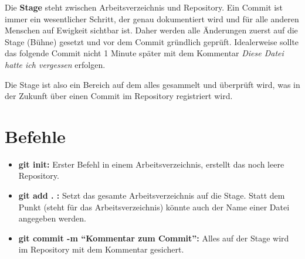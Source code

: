\documentclass[11pt]{article}
\begin{document}
Die \textbf{Stage} steht zwischen Arbeitsverzeichnis und Repository.
Ein Commit ist immer ein wesentlicher Schritt, der genau dokumentiert
wird und für alle anderen Menschen auf Ewigkeit sichtbar ist. Daher
werden alle Änderungen zuerst auf die Stage (Bühne) gesetzt und vor
dem Commit gründlich geprüft. Idealerweise sollte das folgende Commit
nicht 1 Minute später mit dem Kommentar \textsl{Diese Datei hatte ich
  vergessen} erfolgen.

Die Stage ist also ein Bereich auf dem alles gesammelt und überprüft
wird, was in der Zukunft über einen Commit im  Repository registriert wird.



\section{Befehle}
\begin{itemize}
\item \textbf{git init:} Erster Befehl in einem Arbeitsverzeichnis,
  erstellt das noch leere Repository.
\item \textbf{git add . :} Setzt das gesamte Arbeitsverzeichnis auf
  die Stage. Statt dem Punkt (steht für das Arbeitsverzeichnis) könnte
  auch der Name einer Datei angegeben werden.
\item \textbf{git commit -m \enquote{Kommentar zum Commit}:} Alles auf
  der Stage wird im Repository mit dem Kommentar gesichert. 
\end{itemize}
\end{document}
